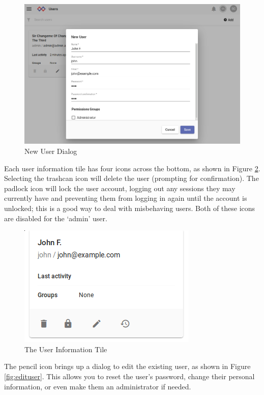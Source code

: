 \begin{figure}
	\includegraphics{images/newuser.png}
	\caption{New User Dialog}
	\label{fig:newuser}
\end{figure}


Each user information tile has four icons across the bottom, as shown in Figure \ref{fig:usertile}.
Selecting the trashcan icon will delete the user (prompting for
confirmation). The padlock icon will lock the user account, logging out
any sessions they may currently have and preventing them from logging in
again until the account is unlocked; this is a good way to deal with
misbehaving users. Both of these icons are disabled for the `admin'
user.


\begin{figure}
	\includegraphics[width=0.5\linewidth]{images/usertile.png}
	\caption{The User Information Tile}
	\label{fig:usertile}
\end{figure}

The pencil icon brings up a dialog to edit the existing user, as shown in Figure \ref{fig:edituser}.
This allows you to reset the user's password, change their personal
information, or even make them an administrator if needed.

